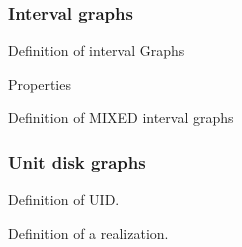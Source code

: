 \subsubsection{Interval graphs}

Definition of interval Graphs

Properties

Definition of MIXED interval graphs
\subsubsection{Unit disk graphs}

%
Definition of UID.

Definition of a realization.
